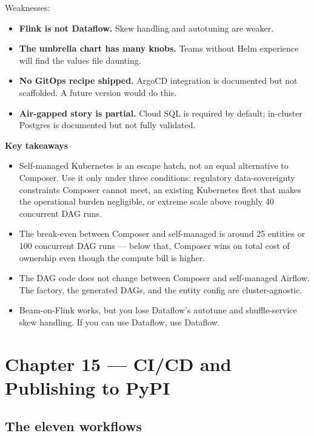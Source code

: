 \documentclass[
  11pt,
  british,
  oneside]{book}
\providecommand{\tightlist}{%
  \setlength{\itemsep}{0pt}\setlength{\parskip}{0pt}}
\begin{document}
Weaknesses:

\begin{itemize}
\tightlist
\item
  \textbf{Flink is not Dataflow.} Skew handling and autotuning are
  weaker.
\item
  \textbf{The umbrella chart has many knobs.} Teams without Helm
  experience will find the values file daunting.
\item
  \textbf{No GitOps recipe shipped.} ArgoCD integration is documented
  but not scaffolded. A future version would do this.
\item
  \textbf{Air-gapped story is partial.} Cloud SQL is required by
  default; in-cluster Postgres is documented but not fully validated.
\end{itemize}

\begin{takeaways}
\textbf{Key takeaways}
\begin{itemize}
  \item Self-managed Kubernetes is an escape hatch, not an equal alternative to Composer. Use it only under three conditions: regulatory data-sovereignty constraints Composer cannot meet, an existing Kubernetes fleet that makes the operational burden negligible, or extreme scale above roughly 40 concurrent DAG runs.
  \item The break-even between Composer and self-managed is around 25 entities or 100 concurrent DAG runs — below that, Composer wins on total cost of ownership even though the compute bill is higher.
  \item The DAG code does not change between Composer and self-managed Airflow. The factory, the generated DAGs, and the entity config are cluster-agnostic.
  \item Beam-on-Flink works, but you lose Dataflow's autotune and shuffle-service skew handling. If you can use Dataflow, use Dataflow.
\end{itemize}
\end{takeaways}

\newpage

\hypertarget{chapter-15-cicd-and-publishing-to-pypi}{%
\chapter{Chapter 15 --- CI/CD and Publishing to
PyPI}\label{chapter-15-cicd-and-publishing-to-pypi}}

\hypertarget{the-eleven-workflows}{%
\section{The eleven workflows}\label{the-eleven-workflows}}
\end{document}
